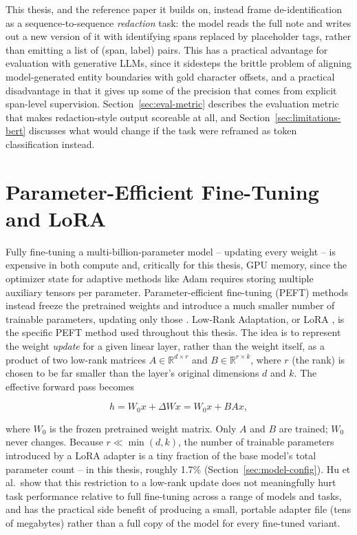\documentclass[12pt,a4paper]{report}
\begin{document}
This thesis, and the reference paper it builds on, instead frame de-identification as a sequence-to-sequence \emph{redaction} task: the model reads the full note and writes out a new version of it with identifying spans replaced by placeholder tags, rather than emitting a list of (span, label) pairs. This has a practical advantage for evaluation with generative LLMs, since it sidesteps the brittle problem of aligning model-generated entity boundaries with gold character offsets, and a practical disadvantage in that it gives up some of the precision that comes from explicit span-level supervision. Section~\ref{sec:eval-metric} describes the evaluation metric that makes redaction-style output scoreable at all, and Section~\ref{sec:limitations-bert} discusses what would change if the task were reframed as token classification instead.

\section{Parameter-Efficient Fine-Tuning and LoRA}

Fully fine-tuning a multi-billion-parameter model -- updating every weight -- is expensive in both compute and, critically for this thesis, GPU memory, since the optimizer state for adaptive methods like Adam requires storing multiple auxiliary tensors per parameter. Parameter-efficient fine-tuning (PEFT) methods instead freeze the pretrained weights and introduce a much smaller number of trainable parameters, updating only those \citep{xu2024peft}. Low-Rank Adaptation, or LoRA \citep{hu2021lora}, is the specific PEFT method used throughout this thesis. The idea is to represent the weight \emph{update} for a given linear layer, rather than the weight itself, as a product of two low-rank matrices $A \in \mathbb{R}^{d \times r}$ and $B \in \mathbb{R}^{r \times k}$, where $r$ (the rank) is chosen to be far smaller than the layer's original dimensions $d$ and $k$. The effective forward pass becomes

\[
h = W_0 x + \Delta W x = W_0 x + BAx,
\]

where $W_0$ is the frozen pretrained weight matrix. Only $A$ and $B$ are trained; $W_0$ never changes. Because $r \ll \min(d,k)$, the number of trainable parameters introduced by a LoRA adapter is a tiny fraction of the base model's total parameter count -- in this thesis, roughly 1.7\% (Section~\ref{sec:model-config}). Hu et al.\ show that this restriction to a low-rank update does not meaningfully hurt task performance relative to full fine-tuning across a range of models and tasks, and has the practical side benefit of producing a small, portable adapter file (tens of megabytes) rather than a full copy of the model for every fine-tuned variant.
\end{document}

